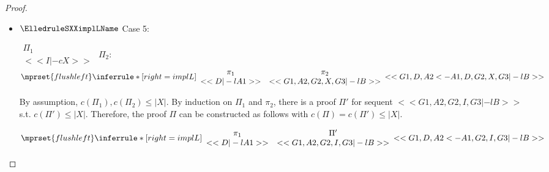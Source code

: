 \begin{proof}
\begin{enumerate}
\begin{itemize}
  \item $\ElledruleSXXimplLName$ Case 5:
      \begin{center}
        \scriptsize
        \begin{math}
          \begin{array}{c}
            \Pi_1 \\
            {<<I |-c X>>}
          \end{array}
        \end{math}
        \qquad\qquad
        $\Pi_2$:
        \begin{math}
          $$\mprset{flushleft}
          \inferrule* [right={\tiny implL}] {
            {
              \begin{array}{cc}
                \pi_1 & \pi_2 \\
                {<<D |-l A1>>} & {<<G1, A2, G2, X, G3 |-l B>>}
              \end{array}
            }
          }{<<G1, D, A2 <- A1, D, G2, X, G3 |-l B>>}
        \end{math}
      \end{center}
      By assumption, $c(\Pi_1),c(\Pi_2)\leq |X|$. By induction on $\Pi_1$ and $\pi_2$, there is
      a proof $\Pi'$ for sequent $<<G1, A2, G2, I, G3 |-l B>>$ s.t. $c(\Pi') \leq |X|$.
      Therefore, the proof $\Pi$ can be constructed as follows with
      $c(\Pi) = c(\Pi') \leq |X|$.
      \begin{center}
        \scriptsize
        \begin{math}
          $$\mprset{flushleft}
          \inferrule* [right={\tiny implL}] {
            {
              \begin{array}{cc}
                \pi_1 & \Pi' \\
                {<<D |-l A1>>} & {<<G1, A2, G2, I, G3 |-l B>>}
              \end{array}
            }
          }{<<G1, D, A2 <- A1, G2, I, G3 |-l B>>}
        \end{math}
      \end{center}


\end{itemize}
\end{enumerate}
\end{proof}
